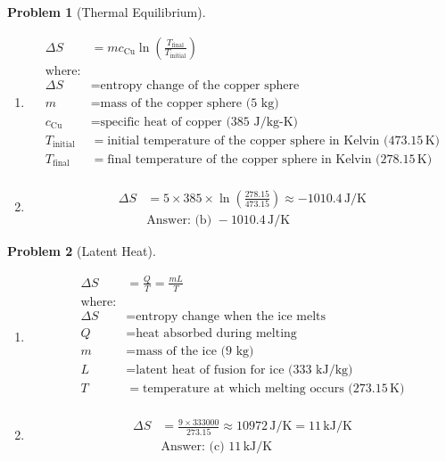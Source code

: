 \documentclass[12pt]{article}
\theoremstyle{definition} %
\newtheorem{problem}{Problem}
\theoremstyle{plain} %
\begin{document}
\begin{problem}[Thermal Equilibrium]
    \noindent  
    \begin{enumerate}
        \item \begin{align*}
        \Delta S &= m c_{\text{Cu}} \ln \left( \frac{T_{\text{final}}}{T_{\text{initial}}} \right) \\
        \text{where:} \\
        \Delta S &= \text{entropy change of the copper sphere} \\
        m &= \text{mass of the copper sphere (5 kg)} \\
        c_{\text{Cu}} &= \text{specific heat of copper (385 J/kg-K)} \\
        T_{\text{initial}} &= \text{initial temperature of the copper sphere in Kelvin (} 473.15 \, \text{K)} \\
        T_{\text{final}} &= \text{final temperature of the copper sphere in Kelvin (} 278.15 \, \text{K)} \\
        \end{align*}
        \item \begin{align*}
        \Delta S &= 5 \times 385 \times \ln \left( \frac{278.15}{473.15} \right) \approx -1010.4 \, \text{J/K} \\
        &\text{Answer: (b) } -1010.4 \, \text{J/K}
        \end{align*}
    \end{enumerate}
\end{problem}
\begin{problem}[Latent Heat]
    \noindent
    \begin{enumerate}
        \item \begin{align*}
        \Delta S &= \frac{Q}{T} = \frac{m L}{T} \\
        \text{where:} \\
        \Delta S &= \text{entropy change when the ice melts} \\
        Q &= \text{heat absorbed during melting} \\
        m &= \text{mass of the ice (9 kg)} \\
        L &= \text{latent heat of fusion for ice (333 kJ/kg)} \\
        T &= \text{temperature at which melting occurs (} 273.15 \, \text{K)} \\
        \end{align*}
        \item \begin{align*}
        \Delta S &= \frac{9 \times 333000}{273.15} \approx 10972 \, \text{J/K} = 11 \, \text{kJ/K} \\
        &\text{Answer: (c) } 11 \, \text{kJ/K}
        \end{align*}
    \end{enumerate}
\end{problem}
\end{document}
